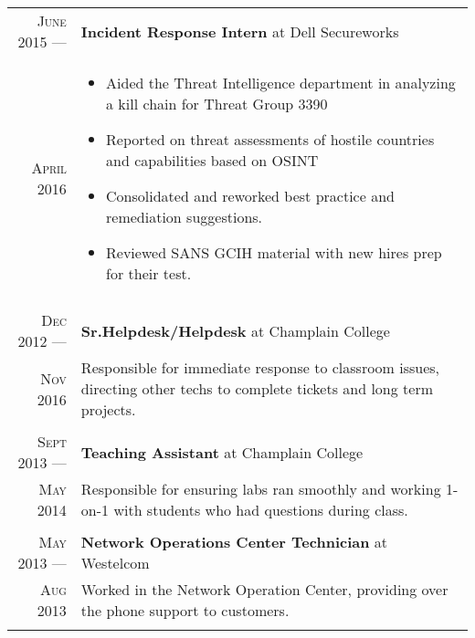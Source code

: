 \documentclass[a4paper,10pt]{article}
\begin{document}
\begin{tabular}{r|p{11cm}}
 \textsc{June 2015} ---            & \textbf{Incident Response Intern} at Dell Secureworks\\
 \textsc{April 2016} \hphantom{---} & \footnotesize{
         \vspace{-2mm}
         \begin{itemize}[leftmargin=*]
            \item Aided the Threat Intelligence department in analyzing a kill chain for Threat Group 3390
            \item Reported on threat assessments of hostile countries and capabilities based on OSINT
            \item Consolidated and reworked best practice and remediation suggestions.
            \item Reviewed SANS GCIH material with new hires prep for their test.
        \end{itemize}
        \vspace*{-\baselineskip}
    }\\
\multicolumn{2}{c}{} \\

\textsc{Dec 2012} ---            & \textbf{Sr.Helpdesk/Helpdesk} at Champlain College\\
\textsc{Nov 2016} \hphantom{---} & \footnotesize{ Responsible for immediate response to classroom issues, directing other techs to complete tickets and long term projects.
         \vspace{-2mm}
        \vspace*{-\baselineskip}
    }\\
\multicolumn{2}{c}{}  \\

\textsc{Sept 2013} ---            & \textbf{Teaching Assistant} at Champlain College\\
\textsc{May 2014} \hphantom{---} & \footnotesize{ Responsible for ensuring labs ran smoothly and working 1-on-1 with students who had questions during class. 
         \vspace{-2mm}
        \vspace*{-\baselineskip}
    }\\
\multicolumn{2}{c}{} \\

\textsc{May 2013} ---            & \textbf{Network Operations Center Technician} at Westelcom\\
\textsc{Aug 2013} \hphantom{---} & \footnotesize{ Worked in the Network Operation Center, providing over the phone support to customers.
         \vspace{-2mm}
        \vspace*{-\baselineskip}
    }\\
\multicolumn{2}{c}{} \\

\end{tabular}
\end{document}
